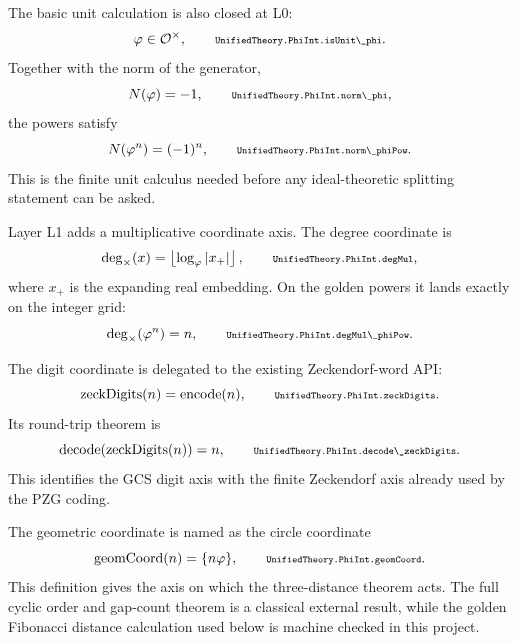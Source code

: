 \documentclass[11pt]{article}
\newcommand{\lean}[1]{\relax\ifmmode\hbox{\scriptsize\ttfamily\detokenize{#1}}\else{\small\texttt{\detokenize{#1}}}\fi}
\begin{document}
The basic unit calculation is also closed at L0:
$$
  \varphi\in\mathcal O^\times,
  \qquad
  \lean{UnifiedTheory.PhiInt.isUnit\_phi}.
$$
Together with the norm of the generator,
$$
  N(\varphi)=-1,
  \qquad
  \lean{UnifiedTheory.PhiInt.norm\_phi},
$$
the powers satisfy
$$
  N(\varphi^n)=(-1)^n,
  \qquad
  \lean{UnifiedTheory.PhiInt.norm\_phiPow}.
$$
This is the finite unit calculus needed before any ideal-theoretic splitting statement can be asked.

Layer L1 adds a multiplicative coordinate axis.  The degree coordinate is
$$
  \deg_\times(x)=\left\lfloor\log_\varphi |x_+|\right\rfloor,
  \qquad
  \lean{UnifiedTheory.PhiInt.degMul},
$$
where $x_+$ is the expanding real embedding.  On the golden powers it lands exactly on the integer grid:
$$
  \deg_\times(\varphi^n)=n,
  \qquad
  \lean{UnifiedTheory.PhiInt.degMul\_phiPow}.
$$

The digit coordinate is delegated to the existing Zeckendorf-word API:
$$
  \operatorname{zeckDigits}(n)=\operatorname{encode}(n),
  \qquad
  \lean{UnifiedTheory.PhiInt.zeckDigits}.
$$
Its round-trip theorem is
$$
  \operatorname{decode}(\operatorname{zeckDigits}(n))=n,
  \qquad
  \lean{UnifiedTheory.PhiInt.decode\_zeckDigits}.
$$
This identifies the GCS digit axis with the finite Zeckendorf axis already used by the PZG coding.

The geometric coordinate is named as the circle coordinate
$$
  \operatorname{geomCoord}(n)=\{n\varphi\},
  \qquad
  \lean{UnifiedTheory.PhiInt.geomCoord}.
$$
This definition gives the axis on which the three-distance theorem acts.  The full cyclic order and gap-count theorem is a classical external result, while the golden Fibonacci distance calculation used below is machine checked in this project.
\end{document}
